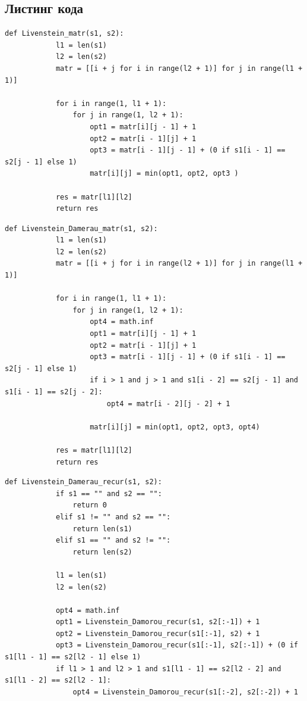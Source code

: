 \documentclass[a4paper,12pt]{report}
\begin{document}
\begin{center}
        \subsection{Листинг кода}
        \begin{flushleft}
        \parindent=1cm
        \begin{lstlisting}[label=some-code,caption=Функция нахождения расстояния Левенштейна итеративно]
  		def Livenstein_matr(s1, s2):
    		l1 = len(s1)
    		l2 = len(s2)
		    matr = [[i + j for i in range(l2 + 1)] for j in range(l1 + 1)]
    
		    for i in range(1, l1 + 1):
        		for j in range(1, l2 + 1):
		            opt1 = matr[i][j - 1] + 1
        		    opt2 = matr[i - 1][j] + 1
            		opt3 = matr[i - 1][j - 1] + (0 if s1[i - 1] == s2[j - 1] else 1)
            		matr[i][j] = min(opt1, opt2, opt3 )
  		  	            
	    	res = matr[l1][l2]
    		return res
        \end{lstlisting}
        \newpage
        \begin{lstlisting}[label=some-code,caption=Функция нахождения расстояния Дамерау-Левенштейна итеративно]
		def Livenstein_Damerau_matr(s1, s2):
			l1 = len(s1)
			l2 = len(s2)
			matr = [[i + j for i in range(l2 + 1)] for j in range(l1 + 1)]
			
			for i in range(1, l1 + 1):
				for j in range(1, l2 + 1):
				    opt4 = math.inf
				    opt1 = matr[i][j - 1] + 1
				    opt2 = matr[i - 1][j] + 1
				    opt3 = matr[i - 1][j - 1] + (0 if s1[i - 1] == s2[j - 1] else 1)
				    if i > 1 and j > 1 and s1[i - 2] == s2[j - 1] and s1[i - 1] == s2[j - 2]:
				        opt4 = matr[i - 2][j - 2] + 1
				    
				    matr[i][j] = min(opt1, opt2, opt3, opt4)
				    
			res = matr[l1][l2]
			return res
        \end{lstlisting}
        \begin{lstlisting}[label=some-code,caption=Функция нахождения расстояния Дамерау-Левенштейна рекурсивно]
	def Livenstein_Damerau_recur(s1, s2):
			if s1 == "" and s2 == "":
				return 0
			elif s1 != "" and s2 == "":
				return len(s1)
			elif s1 == "" and s2 != "":
				return len(s2)
				
			l1 = len(s1)
			l2 = len(s2)

			opt4 = math.inf
			opt1 = Livenstein_Damorou_recur(s1, s2[:-1]) + 1
			opt2 = Livenstein_Damorou_recur(s1[:-1], s2) + 1
			opt3 = Livenstein_Damorou_recur(s1[:-1], s2[:-1]) + (0 if s1[l1 - 1] == s2[l2 - 1] else 1)    
			if l1 > 1 and l2 > 1 and s1[l1 - 1] == s2[l2 - 2] and s1[l1 - 2] == s2[l2 - 1]:
				opt4 = Livenstein_Damorou_recur(s1[:-2], s2[:-2]) + 1
				

\end{lstlisting}
\end{flushleft}
\end{center}
\end{document}
